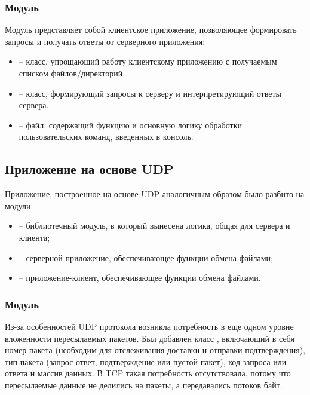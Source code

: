 \subsubsection{Модуль }

Модуль  представляет собой клиентское приложение, позволяющее формировать запросы и получать ответы от серверного приложения:
\begin{itemize}
	\item {} -- класс, упрощающий работу клиентскому приложению с получаемым списком файлов/директорий.
	\item {} -- класс, формирующий запросы к серверу и интерпретирующий ответы сервера.
	\item {} -- файл, содержащий функцию  и основную логику обработки пользовательских команд, введенных в консоль.
\end{itemize}

\subsection{Приложение на основе UDP}

Приложение, построенное на основе UDP  аналогичным образом было разбито на модули:
\begin{itemize}
	\item {} -- библиотечный модуль, в который вынесена логика, общая для сервера и клиента;
	\item {} -- серверной приложение, обеспечивающее функции обмена файлами;
	\item {} -- приложение-клиент, обеспечивающее функции обмена файлами.
\end{itemize}

\subsubsection{Модуль }

Из-за особенностей UDP протокола возникла потребность в еще одном уровне вложенности пересылаемых пакетов. Был добавлен класс , включающий в себя номер пакета (необходим для отслеживания доставки и отправки подтверждения), тип пакета (запрос ответ, подтверждение или пустой пакет), код запроса или ответа и массив данных. В TCP такая потребность отсутствовала, потому что пересылаемые данные не делились на пакеты, а передавались потоков байт.

